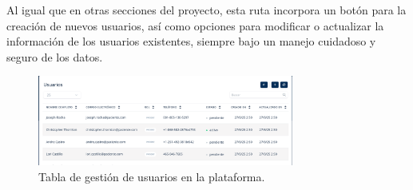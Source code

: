 \documentclass[12pt, a4paper]{article}
\begin{document}
\begin{umaappendices}
Al igual que en otras secciones del proyecto, esta ruta incorpora un botón para la creación de nuevos usuarios, así como opciones para modificar o actualizar la información de los usuarios existentes, siempre bajo un manejo cuidadoso y seguro de los datos.

\begin{figure}[htbp]
	\centering
	\includegraphics[width=0.75\textwidth]{images/14}
	\caption[Ejemplo]{Tabla de gestión de usuarios en la plataforma.}
	\label{fig:usuari}
\end{figure}


	

\end{umaappendices}
\newpage

\end{document}
